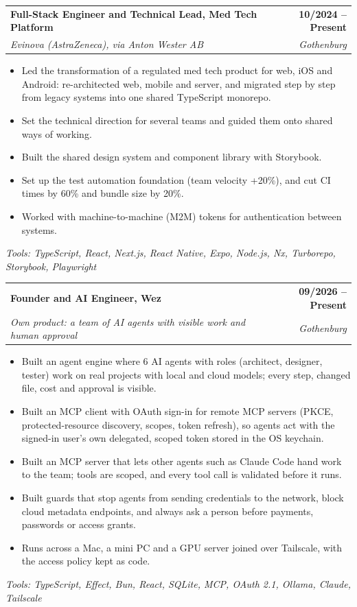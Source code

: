 \documentclass[a4paper,11pt]{article}
\makeatletter
\newcommand{\role}[4]{%
  \vspace{4pt}
  \begin{tabular*}{\textwidth}[t]{l@{\extracolsep{\fill}}r}
    \textbf{#1} & \textbf{\small #2} \\
    \textit{\small #3} & \textit{\small #4} \\
  \end{tabular*}\vspace{-2pt}}
\newenvironment{points}{\begin{itemize}[leftmargin=0.18in, itemsep=1pt, topsep=2pt, parsep=0pt]\small}{\end{itemize}}
\newcommand{\tools}[1]{{\small\textit{Tools: #1}}\par}
\makeatother
\begin{document}
\role{Full-Stack Engineer and Technical Lead, Med Tech Platform}{10/2024 -- Present}{Evinova (AstraZeneca), via Anton Wester AB}{Gothenburg}
\begin{points}
  \item Led the transformation of a regulated med tech product for web, iOS and Android: re-architected web, mobile and server, and migrated step by step from legacy systems into one shared TypeScript monorepo.
  \item Set the technical direction for several teams and guided them onto shared ways of working.
  \item Built the shared design system and component library with Storybook.
  \item Set up the test automation foundation (team velocity +20\%), and cut CI times by 60\% and bundle size by 20\%.
  \item Worked with machine-to-machine (M2M) tokens for authentication between systems.
\end{points}
\tools{TypeScript, React, Next.js, React Native, Expo, Node.js, Nx, Turborepo, Storybook, Playwright}

\role{Founder and AI Engineer, Wez}{09/2026 -- Present}{Own product: a team of AI agents with visible work and human approval}{Gothenburg}
\begin{points}
  \item Built an agent engine where 6 AI agents with roles (architect, designer, tester) work on real projects with local and cloud models; every step, changed file, cost and approval is visible.
  \item Built an MCP client with OAuth sign-in for remote MCP servers (PKCE, protected-resource discovery, scopes, token refresh), so agents act with the signed-in user's own delegated, scoped token stored in the OS keychain.
  \item Built an MCP server that lets other agents such as Claude Code hand work to the team; tools are scoped, and every tool call is validated before it runs.
  \item Built guards that stop agents from sending credentials to the network, block cloud metadata endpoints, and always ask a person before payments, passwords or access grants.
  \item Runs across a Mac, a mini PC and a GPU server joined over Tailscale, with the access policy kept as code.
\end{points}
\tools{TypeScript, Effect, Bun, React, SQLite, MCP, OAuth 2.1, Ollama, Claude, Tailscale}
\end{document}
